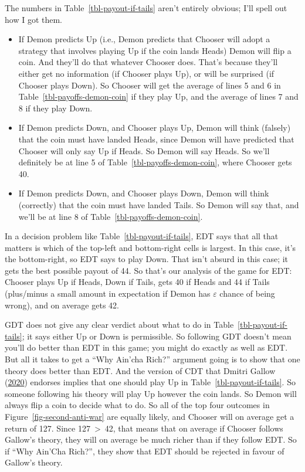 \documentclass[
  12pt,
  letterpaper,
  DIV=11,
  numbers=noendperiod]{scrreprt}
\providecommand{\tightlist}{%
  \setlength{\itemsep}{0pt}\setlength{\parskip}{0pt}}\usepackage{longtable,booktabs,array}
\begin{document}
The numbers in Table~\ref{tbl-payout-if-tails} aren't entirely obvious;
I'll spell out how I got them.

\begin{itemize}
\tightlist
\item
  If Demon predicts Up (i.e., Demon predicts that Chooser will adopt a
  strategy that involves playing Up if the coin lands Heads) Demon will
  flip a coin. And they'll do that whatever Chooser does. That's because
  they'll either get no information (if Chooser plays Up), or will be
  surprised (if Chooser plays Down). So Chooser will get the average of
  lines 5 and 6 in Table~\ref{tbl-payoffs-demon-coin} if they play Up,
  and the average of lines 7 and 8 if they play Down.
\item
  If Demon predicts Down, and Chooser plays Up, Demon will think
  (falsely) that the coin must have landed Heads, since Demon will have
  predicted that Chooser will only say Up if Heads. So Demon will say
  Heads. So we'll definitely be at line 5 of
  Table~\ref{tbl-payoffs-demon-coin}, where Chooser gets 40.
\item
  If Demon predicts Down, and Chooser plays Down, Demon will think
  (correctly) that the coin must have landed Tails. So Demon will say
  that, and we'll be at line 8 of Table~\ref{tbl-payoffs-demon-coin}.
\end{itemize}

In a decision problem like Table~\ref{tbl-payout-if-tails}, EDT says
that all that matters is which of the top-left and bottom-right cells is
largest. In this case, it's the bottom-right, so EDT says to play Down.
That isn't absurd in this case; it gets the best possible payout of 44.
So that's our analysis of the game for EDT: Chooser plays Up if Heads,
Down if Tails, gets 40 if Heads and 44 if Tails (plus/minus a small
amount in expectation if Demon has \(\varepsilon\) chance of being
wrong), and on average gets 42.

GDT does not give any clear verdict about what to do in
Table~\ref{tbl-payout-if-tails}; it says either Up or Down is
permissible. So following GDT doesn't mean you'll do better than EDT in
this game; you might do exactly as well as EDT. But all it takes to get
a ``Why Ain'cha Rich?'' argument going is to show that one theory does
better than EDT. And the version of CDT that Dmitri Gallow
(\protect\hyperlink{ref-Gallow2020}{2020}) endorses implies that one
should play Up in Table~\ref{tbl-payout-if-tails}. So someone following
his theory will play Up however the coin lands. So Demon will always
flip a coin to decide what to do. So all of the top four outcomes in
Figure~\ref{fig-second-anti-war} are equally likely, and Chooser will on
average get a return of 127. Since 127~\textgreater~42, that means that
on average if Chooser follows Gallow's theory, they will on average be
much richer than if they follow EDT. So if ``Why Ain'Cha Rich?'', they
show that EDT should be rejected in favour of Gallow's theory.
\end{document}
